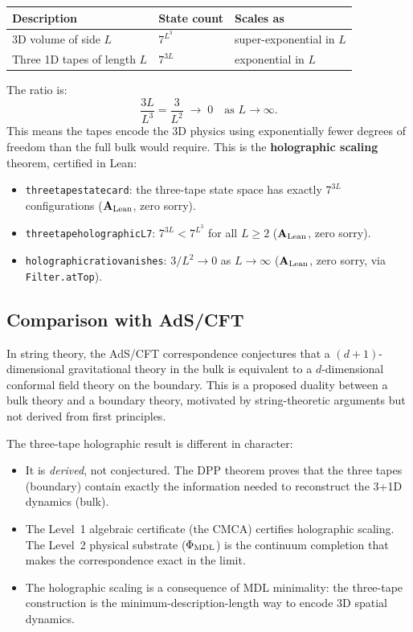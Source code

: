 \documentclass[11pt,a4paper]{article}
\newcommand{\term}[1]{\textbf{#1}}
\newcommand{\lean}[1]{%
  \penalty-100
  \begingroup\def\_{\textunderscore\allowbreak}\texttt{#1}\endgroup}
\newcommand{\CatAL}{\ensuremath{\mathbf{A}_{\rm Lean}}}
\begin{document}
\begin{center}
\begin{tabular}{lll}
\toprule
Description & State count & Scales as \\
\midrule
3D volume of side $L$ & $7^{L^3}$ & super-exponential in $L$ \\
Three 1D tapes of length $L$ & $7^{3L}$ & exponential in $L$ \\
\bottomrule
\end{tabular}
\end{center}

The ratio is:
\[
  \frac{3L}{L^3} = \frac{3}{L^2} \;\longrightarrow\; 0
  \quad\text{as } L \to \infty.
\]
This means the tapes encode the 3D physics using exponentially fewer
degrees of freedom than the full bulk would require.  This is the
\term{holographic scaling} theorem, certified in Lean:

\medskip
\begin{itemize}
  \item \lean{three\_tape\_state\_card}: the three-tape state space has
        exactly $7^{3L}$ configurations (\CatAL, zero sorry).
  \item \lean{three\_tape\_holographic\_L7}: $7^{3L} < 7^{L^3}$ for all
        $L \geq 2$ (\CatAL, zero sorry).
  \item \lean{holographic\_ratio\_vanishes}: $3/L^2 \to 0$ as $L \to \infty$
        (\CatAL, zero sorry, via \lean{Filter.atTop}).
\end{itemize}

\subsection{Comparison with AdS/CFT}

In string theory, the AdS/CFT correspondence conjectures that a
$(d{+}1)$-dimensional gravitational theory in the bulk is equivalent to a
$d$-dimensional conformal field theory on the boundary.
This is a proposed duality between a bulk theory and a boundary theory,
motivated by string-theoretic arguments but not derived from first
principles.

The three-tape holographic result is different in character:
\begin{itemize}
  \item It is \emph{derived}, not conjectured.  The DPP theorem proves
        that the three tapes (boundary) contain exactly the information
        needed to reconstruct the 3+1D dynamics (bulk).
  \item The Level~1 algebraic certificate (the CMCA) certifies holographic
        scaling.  The Level~2 physical substrate ($\Phi_{\rm MDL}$) is the
        continuum completion that makes the correspondence exact in the limit.
  \item The holographic scaling is a consequence of MDL minimality:
        the three-tape construction is the minimum-description-length
        way to encode 3D spatial dynamics.
\end{itemize}
\end{document}
